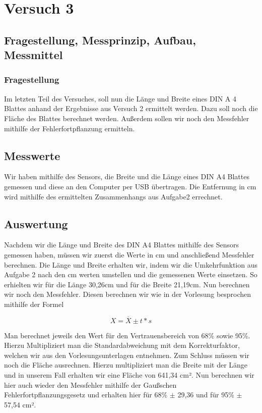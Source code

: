\documentclass[TGAI_Laborbericht.tex]{subfiles}
\begin{document}
\chapter{Versuch 3}
\label{chap:VERSUCH_3}

\section{Fragestellung, Messprinzip, Aufbau, Messmittel}
\label{chap:VERSUCH_3_FRAGESTELLUNG}
\subsection{Fragestellung}
Im letzten Teil des Versuches, soll nun die Länge und Breite eines DIN A 4 Blattes anhand der Ergebnisse aus Versuch 2 ermittelt werden. Dazu soll noch die Fläche des Blattes berechnet werden. Außerdem sollen wir noch den Messfehler mithilfe der Fehlerfortpflanzung ermitteln.
\section{Messwerte}
\label{chap:VERSUCH_3_MESSWERTE}
Wir haben mithilfe des Sensors, die Breite und die Länge eines DIN A4 Blattes gemessen und diese an den Computer per USB übertragen. Die Entfernung in cm wird mithilfe des ermittelten Zusammenhangs aus Aufgabe2 errechnet.
\section{Auswertung}
\label{chap:VERSUCH_3_AUSWERTUNG}
Nachdem wir die Länge und Breite des DIN A4 Blattes mithilfe des Sensors gemessen haben, müssen wir zuerst die Werte in cm und anschließend Messfehler berechnen. Die Länge und Breite erhalten wir, indem wir die Umkehrfunktion aus Aufgabe 2 nach den cm werten umstellen und die gemessenen Werte einsetzen.
So erhielten wir für die Länge 30,26cm und für die Breite 21,19cm.
Nun berechnen wir noch den Messfehler. Diesen berechnen wir wie in der Vorlesung besprochen mithilfe der Formel

\begin{equation}
X = \overline{X} \pm t * s 
\end{equation}

Man berechnet jeweils den Wert für den Vertrauensbereich von 68\% sowie 95\%. Hierzu Multipliziert man die Standardabweichung mit dem Korrekturfaktor, welchen wir aus den Vorlesungsunterlagen entnehmen. Zum Schluss müssen wir noch die Fläche ausrechnen. Hierzu multipliziert man die Breite mit der Länge und in unserem Fall erhalten wir eine Fläche von 641,34 cm². Nun berechnen wir hier auch wieder den Messfehler mithilfe der Gaußschen Fehlerfortpflanzungsgesetz und erhalten hier für 68\% $\pm$ 29,36 und für 95\% $\pm$ 57,54 cm².
\end{document}
